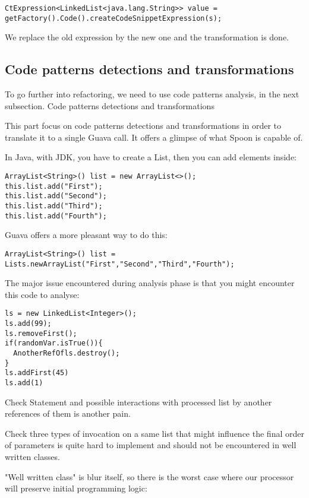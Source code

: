 \documentclass[paper=a4, fontsize=11pt]{scrartcl}
\numberwithin{equation}{section}%
\numberwithin{figure}{section}%
\numberwithin{table}{section}%
\begin{document}
\begin{verbatim}
CtExpression<LinkedList<java.lang.String>> value =
getFactory().Code().createCodeSnippetExpression(s);
\end{verbatim}

We replace the old expression by the new one and the transformation is
done.

\subsection{Code patterns detections and transformations}

To go further into refactoring, we need to use code patterns analysis,
in the next subsection.
Code patterns detections and transformations 

This part focus on code patterns detections and transformations in
order to translate it to a single Guava call. It offers a glimpse of
what Spoon is capable of.

In Java, with JDK, you have to create a List, then you can add
elements inside:
\begin{verbatim}
ArrayList<String>() list = new ArrayList<>();
this.list.add("First");
this.list.add("Second");
this.list.add("Third");
this.list.add("Fourth");
\end{verbatim}

Guava offers a more pleasant way to do this:
\begin{verbatim}
ArrayList<String>() list =
Lists.newArrayList("First","Second","Third","Fourth");
\end{verbatim}
\newpage
The major issue encountered during analysis phase is that you might
encounter this code to analyse:

\begin{verbatim}
ls = new LinkedList<Integer>();
ls.add(99);
ls.removeFirst();
if(randomVar.isTrue()){
  AnotherRefOfls.destroy();
}
ls.addFirst(45)
ls.add(1)
\end{verbatim}


Check Statement and possible interactions with processed list by
another references of them is another pain.

Check three types of invocation on a same list that might influence
the final order of parameters is quite hard to implement and should
not be encountered in well written classes. 




"Well written class" is blur itself, so there is the worst case where
our processor will preserve initial programming logic:
\end{document}
